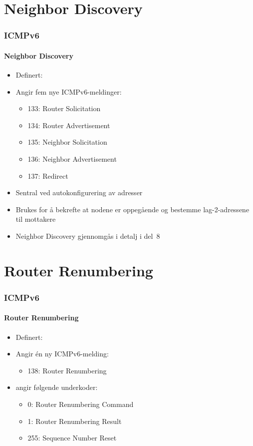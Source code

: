 \section{Neighbor Discovery}
\begin{frame}%
  \frametitle{ICMPv6}
  \framesubtitle{Neighbor Discovery}
  \begin{itemize}%
  \item Definert: 
  \item Angir fem nye ICMPv6-meldinger:
    \begin{itemize}%
    \item 133: Router Solicitation
    \item 134: Router Advertisement
    \item 135: Neighbor Solicitation
    \item 136: Neighbor Advertisement
    \item 137: Redirect
    \end{itemize}
  \item Sentral ved autokonfigurering av adresser
  \item Brukes for å bekrefte at nodene er oppegående og bestemme
    lag-2-adressene til mottakere
  \item Neighbor Discovery gjennomgås i detalj i del~8
  \end{itemize}
\end{frame}

\section{Router Renumbering}
\begin{frame}%
  \frametitle{ICMPv6}
  \framesubtitle{Router Renumbering}
  \begin{itemize}%
  \item Definert: 
  \item Angir én ny ICMPv6-melding:
    \begin{itemize}%
    \item 138: Router Renumbering
    \end{itemize}
  \item {} angir
    følgende underkoder:
    \begin{itemize}%
    \item 0: Router Renumbering Command
    \item 1: Router Renumbering Result
    \item 255: Sequence Number Reset
    \end{itemize}
  \end{itemize}
\end{frame}

